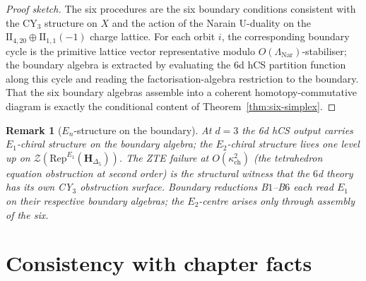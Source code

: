 \documentclass[11pt]{article}
\newtheorem{remark}[theorem]{Remark}
\begin{document}
\begin{proof}[Proof sketch]
The six procedures are the six boundary conditions consistent with
the $\mathrm{CY}_3$ structure on $X$ and the action of the Narain
U-duality on the $\mathrm{II}_{4,20} \oplus \mathrm{II}_{1,1}(-1)$
charge lattice. For each orbit $i$, the corresponding boundary
cycle is the primitive lattice vector representative modulo
$O(\Lambda_{\mathrm{Nar}})$-stabiliser; the boundary algebra is
extracted by evaluating the 6d hCS partition function along this
cycle and reading the factorisation-algebra restriction to the
boundary. That the six boundary algebras assemble into a coherent
homotopy-commutative diagram is exactly the conditional content of
Theorem~\ref{thm:six-simplex}.
\end{proof}

\begin{remark}[$E_n$-structure on the boundary]
\label{rem:En-structure}
At $d = 3$ the 6d hCS output carries $E_1$-chiral structure on the
boundary algebra; the $E_2$-chiral structure lives one level up on
$\mathcal Z(\mathrm{Rep}^{E_1}(\mathbf H_{\Delta_5}))$. The ZTE
failure at $O(\kappa_{\mathrm{ch}}^2)$ (the tetrahedron equation obstruction
at second order) is the structural witness that the
$6$d theory has its own CY$_3$ obstruction surface. Boundary reductions B$1$--B$6$
each read $E_1$ on their respective boundary algebras; the
$E_2$-centre arises only through assembly of the six.
\end{remark}

\section{Consistency with chapter facts}
\label{sec:consistency}
\end{document}
